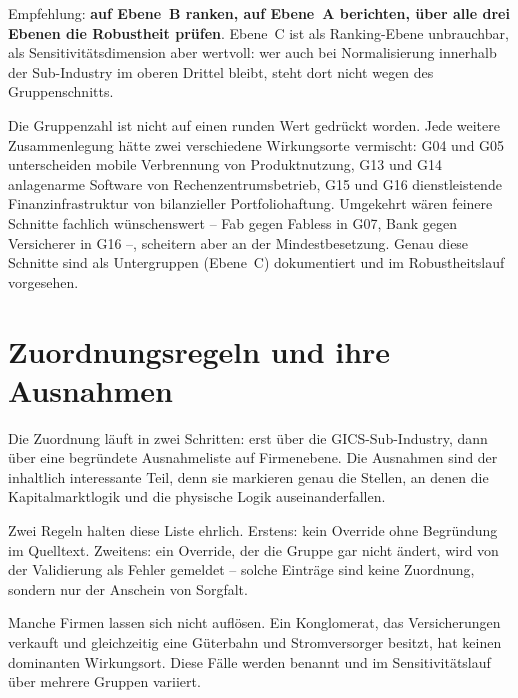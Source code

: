 \documentclass[11pt,a4paper]{article}
\begin{document}
Empfehlung: \textbf{auf Ebene~B ranken, auf Ebene~A berichten, über alle drei Ebenen die Robustheit prüfen}. Ebene~C ist als Ranking-Ebene unbrauchbar, als Sensitivitätsdimension aber wertvoll: wer auch bei Normalisierung innerhalb der Sub-Industry im oberen Drittel bleibt, steht dort nicht wegen des Gruppenschnitts.

Die Gruppenzahl ist nicht auf einen runden Wert gedrückt worden. Jede weitere Zusammenlegung hätte zwei verschiedene Wirkungsorte vermischt: G04 und G05 unterscheiden mobile Verbrennung von Produktnutzung, G13 und G14 anlagenarme Software von Rechenzentrumsbetrieb, G15 und G16 dienstleistende Finanzinfrastruktur von bilanzieller Portfoliohaftung. Umgekehrt wären feinere Schnitte fachlich wünschenswert -- Fab gegen Fabless in G07, Bank gegen Versicherer in G16 --, scheitern aber an der Mindestbesetzung. Genau diese Schnitte sind als Untergruppen (Ebene~C) dokumentiert und im Robustheitslauf vorgesehen.

\section{Zuordnungsregeln und ihre Ausnahmen}

Die Zuordnung läuft in zwei Schritten: erst über die GICS-Sub-Industry, dann über eine begründete Ausnahmeliste auf Firmenebene. Die Ausnahmen sind der inhaltlich interessante Teil, denn sie markieren genau die Stellen, an denen die Kapitalmarktlogik und die physische Logik auseinanderfallen.

\begin{table}[htbp]
\caption{Die \NOverrides{} Einzelfallzuordnungen. ``--'' bedeutet: für diese Sub-Industry existiert keine Standardgruppe, sie wird ausschließlich firmenweise aufgelöst}
\label{tab:overrides}
\small

\end{table}

Zwei Regeln halten diese Liste ehrlich. Erstens: kein Override ohne Begründung im Quelltext. Zweitens: ein Override, der die Gruppe gar nicht ändert, wird von der Validierung als Fehler gemeldet -- solche Einträge sind keine Zuordnung, sondern nur der Anschein von Sorgfalt.

Manche Firmen lassen sich nicht auflösen. Ein Konglomerat, das Versicherungen verkauft und gleichzeitig eine Güterbahn und Stromversorger besitzt, hat keinen dominanten Wirkungsort. Diese Fälle werden benannt und im Sensitivitätslauf über mehrere Gruppen variiert.

\begin{table}[htbp]
\caption{Die \NContested{} strittigen Zuordnungen}
\label{tab:contested}
\small

\end{table}
\end{document}
